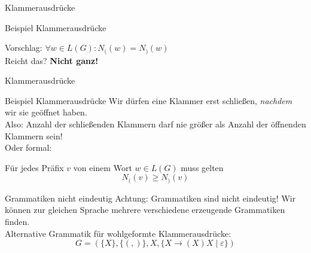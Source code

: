 \begin{frame}{Klammerausdrücke}

	\begin{exampleblock}{Beispiel Klammerausdrücke}
		\bigskip
		\begin{center}			
			Vorschlag: $\forall w \in L(G): N_((w) = N_)(w)$ \\
			\bigskip
			Reicht das? \pause \textbf{Nicht ganz!}
		\end{center}
	\end{exampleblock}

\end{frame}

\begin{frame}{Klammerausdrücke}
	\begin{exampleblock}{Beispiel Klammerausdrücke}	
	Wir dürfen eine Klammer erst schließen, \textit{nachdem} wir sie geöffnet haben.\\
	Also: Anzahl der schließenden Klammern darf nie größer als Anzahl der öffnenden Klammern sein! \pause \\[1em]
	Oder formal: 
	\begin{center}
		Für jedes Präfix $v$ von einem Wort $w \in L(G)$ muss gelten \[N_( (v) \geq N_) (v)\]
	\end{center}
	\end{exampleblock}
	\pause
	\begin{alertblock}{Grammatiken nicht eindeutig}
	Achtung: Grammatiken sind nicht eindeutig! Wir können zur gleichen Sprache mehrere verschiedene erzeugende Grammatiken finden. \\
	Alternative Grammatik für wohlgeformte Klammerausdrücke: $$G = (\{X\}, \{(, )\}, X, \{X \to (X)X \mid \varepsilon\})$$
	\end{alertblock}
	
\end{frame}

